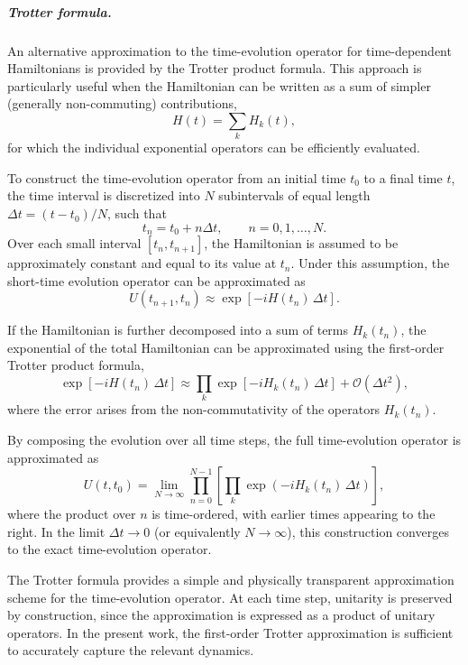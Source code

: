\subparagraph{Trotter formula.}
An alternative approximation to the time-evolution operator for time-dependent Hamiltonians is provided by the Trotter product formula. This approach is particularly useful when the Hamiltonian can be written as a sum of simpler (generally non-commuting) contributions,
\begin{equation}
    H(t) = \sum_{k} H_k(t),
\end{equation}
for which the individual exponential operators can be efficiently evaluated.

To construct the time-evolution operator from an initial time $t_0$ to a final time $t$, the time interval is discretized into $N$ subintervals of equal length $\Delta t = (t - t_0)/N$, such that
\[
    t_n = t_0 + n \Delta t, \qquad n = 0,1,\dots,N.
\]
Over each small interval $[t_n, t_{n+1}]$, the Hamiltonian is assumed to be approximately constant and equal to its value at $t_n$. Under this assumption, the short-time evolution operator can be approximated as
\begin{equation}
    U(t_{n+1}, t_n)
    \approx
    \exp\!\left[-i H(t_n)\, \Delta t\right].
\end{equation}

If the Hamiltonian is further decomposed into a sum of terms $H_k(t_n)$, the exponential of the total Hamiltonian can be approximated using the first-order Trotter product formula,
\begin{equation}
    \exp\!\left[-i H(t_n)\, \Delta t\right]
    \approx
    \prod_{k} \exp\!\left[-i H_k(t_n)\, \Delta t\right]
    + \mathcal{O}(\Delta t^2),
\end{equation}
where the error arises from the non-commutativity of the operators $H_k(t_n)$.

By composing the evolution over all time steps, the full time-evolution operator is approximated as
\begin{equation}
    U(t,t_0)
    =
    \lim_{N \to \infty}
    \prod_{n=0}^{N-1}
    \left[
        \prod_{k} \exp\!\left(-i H_k(t_n)\, \Delta t\right)
        \right],
    \label{eq:trotter}
\end{equation}
where the product over $n$ is time-ordered, with earlier times appearing to the right. In the limit $\Delta t \to 0$ (or equivalently $N \to \infty$), this construction converges to the exact time-evolution operator.

The Trotter formula provides a simple and physically transparent approximation scheme for the time-evolution operator. At each time step, unitarity is preserved by construction, since the approximation is expressed as a product of unitary operators. In the present work, the first-order Trotter approximation is sufficient to accurately capture the relevant dynamics.

